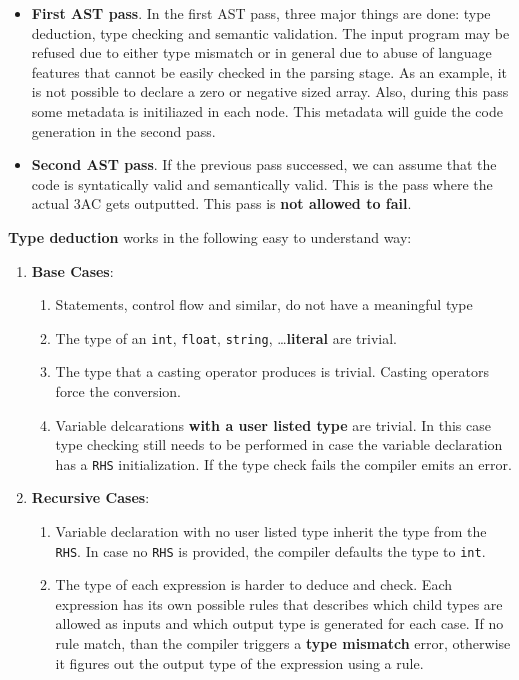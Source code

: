 \documentclass[a4paper]{article}
\begin{document}
\begin{itemize}
\item \textbf{First AST pass}. In the first AST pass, three major things are done: type deduction, type checking and semantic validation.
  The input program may be refused due to either type mismatch or in general due to abuse of language features that cannot
  be easily checked in the parsing stage. As an example, it is not possible to declare a zero or negative sized array.
  Also, during this pass some metadata is initiliazed in each node. This metadata will guide the code generation in the second pass.
\item \textbf{Second AST pass}. If the previous pass successed, we can assume that the code is syntatically valid and semantically valid. This is the pass where the actual 3AC gets outputted.
  This pass is \textbf{not allowed to fail}.
\end{itemize}

\textbf{Type deduction} works in the following easy to understand way:

\begin{enumerate}
\item \textbf{Base Cases}:
  \begin{enumerate}
  \item Statements, control flow and similar, do not have a meaningful type
  \item The type of an \texttt{int}, \texttt{float}, \texttt{string}, \dots  \textbf{literal} are trivial.
  \item The type that a casting operator produces is trivial. Casting operators force the conversion.
  \item Variable delcarations \textbf{with a user listed type} are trivial. In this case type checking still needs
    to be performed in case the variable declaration has a \texttt{RHS} initialization. If the type check
    fails the compiler emits an error.
  \end{enumerate}
  \item \textbf{Recursive Cases}:
    \begin{enumerate}
    \item Variable declaration with no user listed type inherit the type from the \texttt{RHS}. In case
      no \texttt{RHS} is provided, the compiler defaults the type to \texttt{int}.
    \item The type of each expression is harder to deduce and check. Each expression has its own possible
      rules that describes which child types are allowed as inputs and which output type is generated for each case. If
      no rule match, than the compiler triggers a \textbf{type mismatch} error, otherwise it figures out
      the output type of the expression using a rule.
    \end{enumerate}
\end{enumerate}
\end{document}
